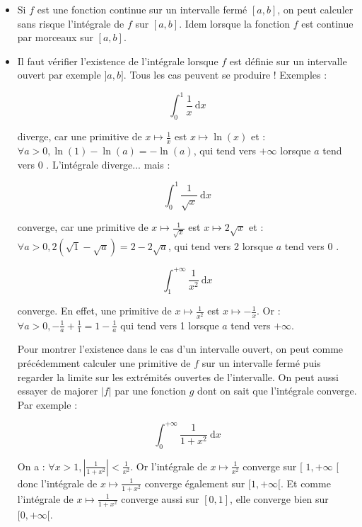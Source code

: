 \begin{itemize}
    \item Si $f$ est une fonction continue sur un intervalle fermé $[a, b]$, on peut calculer sans risque l'intégrale de $f$ sur $[a, b]$. Idem lorsque la fonction $f$ est continue par morceaux sur $[a, b]$.
    \item Il faut vérifier l'existence de l'intégrale lorsque $f$ est définie sur un intervalle ouvert par exemple $] a, b]$. Tous les cas peuvent se produire ! Exemples :

    $$
    \int_0^1 \frac{1}{x} \mathrm{~d} x
    $$
    
    diverge, car une primitive de $x \mapsto \frac{1}{x}$ est $x \mapsto \ln (x)$ et : $\forall a>0, \ln (1)-\ln (a)=-\ln (a)$, qui tend vers $+\infty$ lorsque $a$ tend vers 0 . L'intégrale diverge... mais :
    
    $$
    \int_0^1 \frac{1}{\sqrt{x}} \mathrm{~d} x
    $$
    
    converge, car une primitive de $x \mapsto \frac{1}{\sqrt{x}}$ est $x \mapsto 2 \sqrt{x}$ et : $\forall a>0,2(\sqrt{1}-\sqrt{a})=2-2 \sqrt{a}$, qui tend vers 2 lorsque $a$ tend vers 0 .
    
    $$
    \int_1^{+\infty} \frac{1}{x^2} \mathrm{~d} x
    $$
    
    converge. En effet, une primitive de $x \mapsto \frac{1}{x^2}$ est $x \mapsto-\frac{1}{x}$. Or : $\forall a>0,-\frac{1}{a}+\frac{1}{1}=1-\frac{1}{a}$ qui tend vers 1 lorsque $a$ tend vers $+\infty$.
    
    Pour montrer l'existence dans le cas d'un intervalle ouvert, on peut comme précédemment calculer une primitive de $f$ sur un intervalle fermé puis regarder la limite sur les extrémités ouvertes de l'intervalle. On peut aussi essayer de majorer $|f|$ par une fonction $g$ dont on sait que l'intégrale converge. Par exemple :
    
    $$
    \int_0^{+\infty} \frac{1}{1+x^2} \mathrm{~d} x
    $$
    
    
    On a : $\forall x>1,\left|\frac{1}{1+x^2}\right|<\frac{1}{x^2}$. Or l'intégrale de $x \mapsto \frac{1}{x^2}$ converge sur [ $1,+\infty$ [ donc l'intégrale de $x \mapsto \frac{1}{1+x^2}$ converge également sur $[1,+\infty[$. Et comme l'intégrale de $x \mapsto \frac{1}{1+x^2}$ converge aussi sur $[0,1]$, elle converge bien sur $[0,+\infty[$.
\end{itemize}


